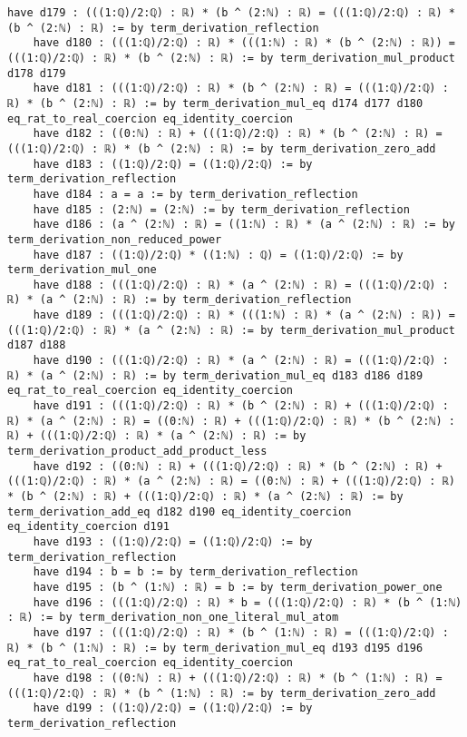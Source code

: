 \documentclass{article}
\begin{document}
\begin{tcolorbox}[colback=white!10, width=\linewidth]
\begin{lstlisting}[language=Lean4]
    have d179 : (((1:ℚ)/2:ℚ) : ℝ) * (b ^ (2:ℕ) : ℝ) = (((1:ℚ)/2:ℚ) : ℝ) * (b ^ (2:ℕ) : ℝ) := by term_derivation_reflection
    have d180 : (((1:ℚ)/2:ℚ) : ℝ) * (((1:ℕ) : ℝ) * (b ^ (2:ℕ) : ℝ)) = (((1:ℚ)/2:ℚ) : ℝ) * (b ^ (2:ℕ) : ℝ) := by term_derivation_mul_product d178 d179
    have d181 : (((1:ℚ)/2:ℚ) : ℝ) * (b ^ (2:ℕ) : ℝ) = (((1:ℚ)/2:ℚ) : ℝ) * (b ^ (2:ℕ) : ℝ) := by term_derivation_mul_eq d174 d177 d180 eq_rat_to_real_coercion eq_identity_coercion
    have d182 : ((0:ℕ) : ℝ) + (((1:ℚ)/2:ℚ) : ℝ) * (b ^ (2:ℕ) : ℝ) = (((1:ℚ)/2:ℚ) : ℝ) * (b ^ (2:ℕ) : ℝ) := by term_derivation_zero_add
    have d183 : ((1:ℚ)/2:ℚ) = ((1:ℚ)/2:ℚ) := by term_derivation_reflection
    have d184 : a = a := by term_derivation_reflection
    have d185 : (2:ℕ) = (2:ℕ) := by term_derivation_reflection
    have d186 : (a ^ (2:ℕ) : ℝ) = ((1:ℕ) : ℝ) * (a ^ (2:ℕ) : ℝ) := by term_derivation_non_reduced_power
    have d187 : ((1:ℚ)/2:ℚ) * ((1:ℕ) : ℚ) = ((1:ℚ)/2:ℚ) := by term_derivation_mul_one
    have d188 : (((1:ℚ)/2:ℚ) : ℝ) * (a ^ (2:ℕ) : ℝ) = (((1:ℚ)/2:ℚ) : ℝ) * (a ^ (2:ℕ) : ℝ) := by term_derivation_reflection
    have d189 : (((1:ℚ)/2:ℚ) : ℝ) * (((1:ℕ) : ℝ) * (a ^ (2:ℕ) : ℝ)) = (((1:ℚ)/2:ℚ) : ℝ) * (a ^ (2:ℕ) : ℝ) := by term_derivation_mul_product d187 d188
    have d190 : (((1:ℚ)/2:ℚ) : ℝ) * (a ^ (2:ℕ) : ℝ) = (((1:ℚ)/2:ℚ) : ℝ) * (a ^ (2:ℕ) : ℝ) := by term_derivation_mul_eq d183 d186 d189 eq_rat_to_real_coercion eq_identity_coercion
    have d191 : (((1:ℚ)/2:ℚ) : ℝ) * (b ^ (2:ℕ) : ℝ) + (((1:ℚ)/2:ℚ) : ℝ) * (a ^ (2:ℕ) : ℝ) = ((0:ℕ) : ℝ) + (((1:ℚ)/2:ℚ) : ℝ) * (b ^ (2:ℕ) : ℝ) + (((1:ℚ)/2:ℚ) : ℝ) * (a ^ (2:ℕ) : ℝ) := by term_derivation_product_add_product_less
    have d192 : ((0:ℕ) : ℝ) + (((1:ℚ)/2:ℚ) : ℝ) * (b ^ (2:ℕ) : ℝ) + (((1:ℚ)/2:ℚ) : ℝ) * (a ^ (2:ℕ) : ℝ) = ((0:ℕ) : ℝ) + (((1:ℚ)/2:ℚ) : ℝ) * (b ^ (2:ℕ) : ℝ) + (((1:ℚ)/2:ℚ) : ℝ) * (a ^ (2:ℕ) : ℝ) := by term_derivation_add_eq d182 d190 eq_identity_coercion eq_identity_coercion d191
    have d193 : ((1:ℚ)/2:ℚ) = ((1:ℚ)/2:ℚ) := by term_derivation_reflection
    have d194 : b = b := by term_derivation_reflection
    have d195 : (b ^ (1:ℕ) : ℝ) = b := by term_derivation_power_one
    have d196 : (((1:ℚ)/2:ℚ) : ℝ) * b = (((1:ℚ)/2:ℚ) : ℝ) * (b ^ (1:ℕ) : ℝ) := by term_derivation_non_one_literal_mul_atom
    have d197 : (((1:ℚ)/2:ℚ) : ℝ) * (b ^ (1:ℕ) : ℝ) = (((1:ℚ)/2:ℚ) : ℝ) * (b ^ (1:ℕ) : ℝ) := by term_derivation_mul_eq d193 d195 d196 eq_rat_to_real_coercion eq_identity_coercion
    have d198 : ((0:ℕ) : ℝ) + (((1:ℚ)/2:ℚ) : ℝ) * (b ^ (1:ℕ) : ℝ) = (((1:ℚ)/2:ℚ) : ℝ) * (b ^ (1:ℕ) : ℝ) := by term_derivation_zero_add
    have d199 : ((1:ℚ)/2:ℚ) = ((1:ℚ)/2:ℚ) := by term_derivation_reflection

\end{lstlisting}
\end{tcolorbox}
\end{document}
